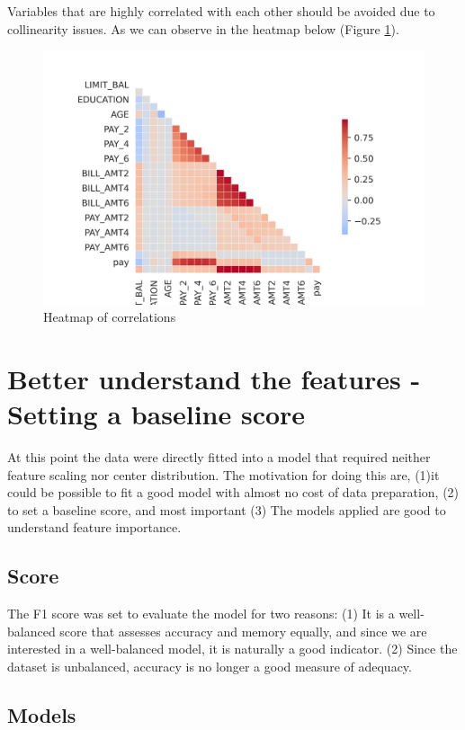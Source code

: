 \documentclass[11pt, a4]{article}
\begin{document}
Variables that are highly correlated with each other should be avoided due to collinearity issues. As we can observe in the heatmap below (Figure \ref{fig:heatmap}).


\begin{figure}
\includegraphics[]{heatmap}
\centering
\caption{Heatmap of correlations}
\label{fig:heatmap}
\end{figure}

\section*{Better understand the features - Setting a baseline score}

At this point the data were directly fitted into a model that required neither feature scaling nor center distribution. The motivation for doing this are, (1)it could be possible to fit a good model with almost no cost of data preparation, (2) to set a baseline score, and most important (3) The models applied are good to understand feature importance.

\subsection*{Score}

The F1 score was set to evaluate the model for two reasons: (1) It is a well-balanced score that assesses accuracy and memory equally, and since we are interested in a well-balanced model, it is naturally a good indicator. (2) Since the dataset is unbalanced, accuracy is no longer a good measure of adequacy.

\subsection*{Models}
\end{document}
